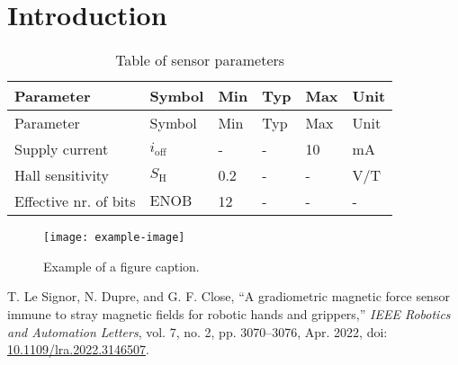 \section{Introduction}
\lipsum[1]

\begin{mytable}
\begin{longtable}[]{@{}llllll@{}}
\caption{\label{tbl-parameters}Table of sensor
parameters}\tabularnewline
\toprule()
Parameter & Symbol & Min & Typ & Max & Unit \\
\midrule()
\endfirsthead
\toprule()
Parameter & Symbol & Min & Typ & Max & Unit \\
\midrule()
\endhead
Supply current & \(i_\mathrm{off}\) & - & - & 10 & mA \\
Hall sensitivity & \(S_\mathrm{H}\) & 0.2 & - & - & V/T \\
Effective nr. of bits & \(\mathrm{ENOB}\) & 12 & - & - & - \\
\bottomrule()
\end{longtable}
\end{mytable}

\lipsum[2]

\begin{figure}[htbp]
\centerline{\texttt{[image: example-image]}}
\caption{Example of a figure caption.}
\label{fig}
\end{figure}

\begin{thebibliography}{00}
 T. Le Signor, N. Dupre, and G. F. Close, {``A
gradiometric magnetic force sensor immune to stray magnetic fields for
robotic hands and grippers,''} \emph{IEEE Robotics and Automation
Letters}, vol. 7, no. 2, pp. 3070--3076, Apr. 2022, doi:
\href{https://doi.org/10.1109/lra.2022.3146507}{10.1109/lra.2022.3146507}.
\end{thebibliography}